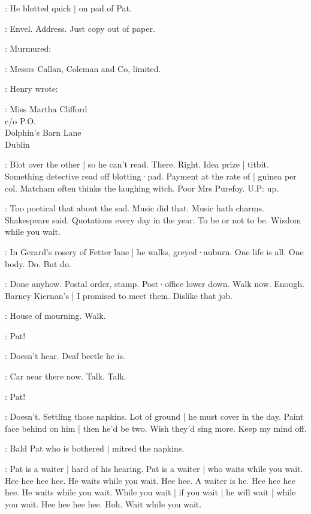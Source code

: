 :
He blotted quick |
on pad of Pat.

\BloomInt:
Envel.
Address.
Just copy out of paper.

:
Murmured:

\BloomInt:
Messrs Callan,
Coleman and Co,
limited.

:
Henry wrote:

:
    Miss Martha Clifford\\
    \-\hspace{3cm}    c/o P.O.\\
    \-\hspace{2cm} Dolphin's Barn Lane\\
    \-\hspace{3cm}    Dublin

\BloomInt:
Blot over the other |
so he can't read.
There.
Right.
Idea prize |
titbit.
Something detective read off blotting·pad.
Payment at the rate of |
guinea per col.
Matcham often thinks the laughing witch.
Poor Mrs Purefoy.
U.P: up.

\BloomInt:
Too poetical that about the sad.
Music did that.
Music hath charms.
Shakespeare said.
Quotations every day in the year.
To be or not to be.
Wisdom while you wait.

\BloomInt:
In Gerard's rosery of Fetter lane |
he walks,
greyed·auburn.
One life is all.
One body.
Do.
But do.

\BloomInt:
Done anyhow.
Postal order,
stamp.
Post·office lower down.
Walk now.
Enough.
Barney Kiernan's |
I promised to meet them.
Dislike that job.

\BloomInt:
House of mourning.
Walk.

\Bloom:
Pat!

\BloomInt:
Doesn't hear.
Deaf beetle he is.

\BloomInt:
Car near there now.
Talk.
Talk.

\Bloom:
Pat!

\BloomInt:
Doesn't.
Settling those napkins.
Lot of ground |
he must cover in the day.
Paint face behind on him |
then he'd be two.
Wish they'd sing more.
Keep my mind off.

:
Bald Pat who is bothered |
mitred the napkins.

\BloomInt:
Pat is a waiter |
hard of his hearing.
Pat is a waiter |
who waits while you wait.
Hee hee hee hee.
He waits while you wait.
Hee hee.
A waiter is he.
Hee hee hee hee.
He waits while you wait.
While you wait |
if you wait |
he will wait |
while you wait.
Hee hee hee hee.
Hoh.
Wait while you wait.

